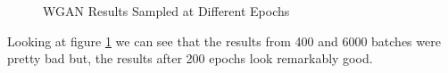 \documentclass[12pt,
 reprint,
nofootinbib,
 amsmath,amssymb,
 aps,
floatfix,
]{revtex4-2}
\begin{document}
\begin{figure}[h!]
    \centering
    \qquad
    \qquad
    \caption{WGAN Results Sampled at Different Epochs}%
    \label{fig:wganResults}%
\end{figure}

Looking at figure \ref{fig:wganResults} we can see that the results from 400 and 6000 batches were pretty bad but, the results after 200 epochs look remarkably good.
\end{document}
